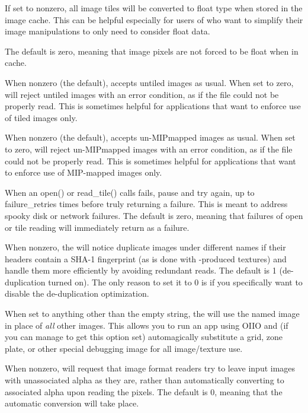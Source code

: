 If set to nonzero, all image tiles will be converted to {\cf float} 
type when stored in the image cache.  This can be helpful especially
for users of \ImageBuf who want to simplify their image manipulations
to only need to consider {\cf float} data.

The default is zero, meaning that image pixels are not forced to
be {\cf float} when in cache.
\apiend

When nonzero (the default), \ImageCache accepts untiled images as
usual.  When set to zero, \ImageCache will reject untiled images with
an error condition, as if the file could not be properly read.
This is sometimes helpful for applications that want to enforce use of
tiled images only.
\apiend

When nonzero (the default), \ImageCache accepts un-MIPmapped images as
usual.  When set to zero, \ImageCache will reject un-MIPmapped images with
an error condition, as if the file could not be properly read.
This is sometimes helpful for applications that want to enforce use of
MIP-mapped images only.
\apiend

When an {\cf open()} or {\cf read_tile()} calls fails, pause and try
again, up to {\cf failure_retries} times before truly returning a
failure.  This is meant to address spooky disk or network failures.  The
default is zero, meaning that failures of open or tile reading will
immediately return as a failure.
\apiend

When nonzero, the \ImageCache will notice duplicate images under
different names if their headers contain a SHA-1 fingerprint (as is done
with \maketx-produced textures) and handle them more efficiently by
avoiding redundant reads.  The default is 1 (de-duplication turned on).
The only reason to set it to 0 is if you specifically want to disable the
de-duplication optimization.
\apiend

When set to anything other than the empty string, the \ImageCache will
use the named image in place of \emph{all} other images.  This allows
you to run an app using OIIO and (if you can manage to get this option
set) automagically substitute a grid, zone plate, or other special
debugging image for all image/texture use.
\apiend

When nonzero, will request that image format readers try to leave input
images with unassociated alpha as they are, rather than automatically
converting to associated alpha upon reading the pixels.  The default is
0, meaning that the automatic conversion will take place.
\apiend

